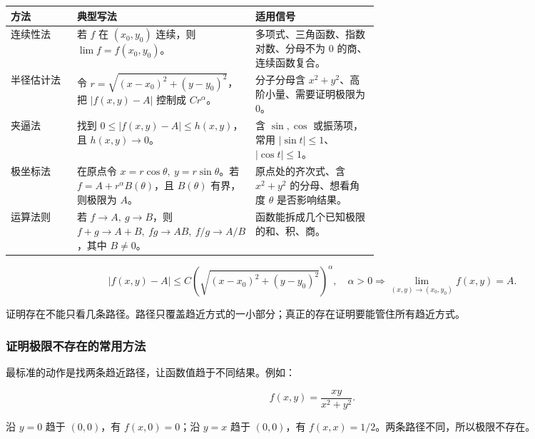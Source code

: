 \begin{center}
\small
\begin{tabularx}{\linewidth}{|>{\raggedright\arraybackslash}p{0.18\linewidth}|>{\raggedright\arraybackslash}p{0.42\linewidth}|>{\raggedright\arraybackslash}X|}
\hline
\textbf{方法} & \textbf{典型写法} & \textbf{适用信号} \\ \hline
连续性法 & 若 \(f\) 在 \((x_0,y_0)\) 连续，则 \(\lim f=f(x_0,y_0)\)。 & 多项式、三角函数、指数对数、分母不为 \(0\) 的商、连续函数复合。 \\ \hline
半径估计法 & 令 \(r=\sqrt{(x-x_0)^2+(y-y_0)^2}\)，把 \(|f(x,y)-A|\) 控制成 \(Cr^\alpha\)。 & 分子分母含 \(x^2+y^2\)、高阶小量、需要证明极限为 \(0\)。 \\ \hline
夹逼法 & 找到 \(0\le |f(x,y)-A|\le h(x,y)\)，且 \(h(x,y)\to0\)。 & 含 \(\sin,\cos\) 或振荡项，常用 \(|\sin t|\le1\)、\(|\cos t|\le1\)。 \\ \hline
极坐标法 & 在原点令 \(x=r\cos\theta,\ y=r\sin\theta\)。若 \(f=A+r^\alpha B(\theta)\)，且 \(B(\theta)\) 有界，则极限为 \(A\)。 & 原点处的齐次式、含 \(x^2+y^2\) 的分母、想看角度 \(\theta\) 是否影响结果。 \\ \hline
运算法则 & 若 \(f\to A,\ g\to B\)，则 \(f+g\to A+B,\ fg\to AB,\ f/g\to A/B\)，其中 \(B\ne0\)。 & 函数能拆成几个已知极限的和、积、商。 \\ \hline
\end{tabularx}
\end{center}

\[
      |f(x,y)-A|\le C\left(\sqrt{(x-x_0)^2+(y-y_0)^2}\right)^\alpha,\quad \alpha>0
      \Longrightarrow
      \lim_{(x,y)\to(x_0,y_0)}f(x,y)=A.
    \]

\begin{notebox}
证明存在不能只看几条路径。路径只覆盖趋近方式的一小部分；真正的存在证明要能管住所有趋近方式。
\end{notebox}

\subsubsection*{证明极限不存在的常用方法}

最标准的动作是找两条趋近路径，让函数值趋于不同结果。例如：

\[
      f(x,y)=\frac{xy}{x^2+y^2}.
    \]

沿 \(y=0\) 趋于 \((0,0)\)，有 \(f(x,0)=0\)；沿 \(y=x\) 趋于 \((0,0)\)，有 \(f(x,x)=1/2\)。两条路径不同，所以极限不存在。

